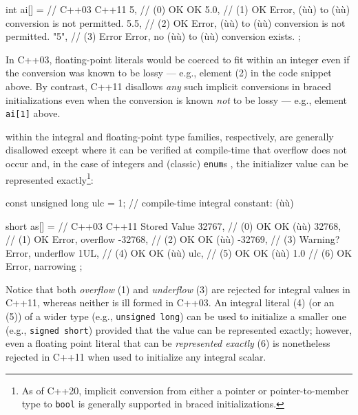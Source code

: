 \begin{emcppslisting}[emcppserrorlines={4,5,6}]
int ai[] =  //      C++03    C++11
{
    5,      // (0)   OK       OK
    5.0,    // (1)   OK      Error, (ù{}ù) to (ù{}ù) conversion is not permitted.
    5.5,    // (2)   OK      Error, (ù{}ù) to (ù{}ù) conversion is not permitted.
    "5",    // (3)  Error    Error, no (ù{}ù) to (ù{}ù) conversion exists.
};
\end{emcppslisting}
    

\noindent In C++03, floating-point literals would be coerced to fit within an
integer even if the conversion was known to be lossy --- e.g., element
(2) in the code snippet above. By contrast, C++11 disallows \emph{any}
such implicit conversions in braced initializations even when the
conversion is known \emph{not} to be lossy --- e.g., element
\lstinline!ai[1]! above.

 within the integral and floating-point
type families, respectively, are generally disallowed except where it
can be verified at compile-time that overflow does not occur and, in the
case of integers and (classic) \lstinline!enum!s , the initializer value
can be represented exactly{\cprotect\footnote{As of C++20, implicit
conversion from either a pointer or pointer-to-member type to
  \lstinline!bool! is generally supported in braced initializations.}}:

\begin{emcppslisting}[emcppserrorlines={6,8,11}]
const unsigned long ulc = 1;  // compile-time integral constant: (ù{}ù)

short as[] =  //       C++03     C++11                        Stored Value
{
     32767,   // (0)     OK        OK                        (ù{}ù)
     32768,   // (1)     OK      Error, overflow
    -32768,   // (2)     OK        OK                        (ù{}ù)
    -32769,   // (3)   Warning?  Error, underflow
    1UL,      // (4)     OK        OK                        (ù{}ù)
    ulc,      // (5)     OK        OK                        (ù{}ù)
    1.0       // (6)     OK      Error, narrowing
};
\end{emcppslisting}
    

\noindent Notice that both \emph{overflow} (1) and \emph{underflow} (3) are
rejected for integral values in C++11, whereas neither is ill formed in
C++03. An integral literal (4) (or an  (5)) of
a wider type (e.g., \lstinline!unsigned!~\lstinline!long!) can be used to
initialize a smaller one (e.g., \lstinline!signed!~\lstinline!short!) provided
that the value can be represented exactly; however, even a floating
point literal that can be \emph{represented exactly} (6) is nonetheless
rejected in C++11 when used to initialize any integral scalar.

